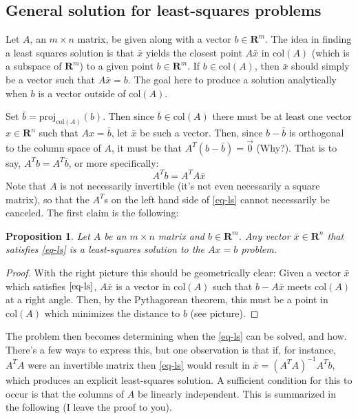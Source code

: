 \documentclass[12pt]{article}
\numberwithin{equation}{subsection}
\numberwithin{figure}{subsection}
\newtheorem{prop}[subsection]{Proposition}
\theoremstyle{note}
\newcommand{\R}{\mathbf{R}}
\newcommand\col[1]{\mathrm{col}(#1)}
\newcommand\proj[2]{\mathrm{proj}_{#1}(#2)}
\begin{document}
\subsection{General solution for least-squares problems}

Let $A$, an $m\times n$ matrix, be given along with a vector $b\in \R^m$. The idea in finding a least squares solution is that $\bar{x}$ yields the closest point $A\bar{x}$ in $\col{A}$ (which is a subspace of $\R^m$) to a given point $b\in \R^m$. If $b\in \col{A}$, then $\bar{x}$ should simply be a vector such that $A\bar{x}=b$. The goal here to produce a solution analytically when $b$ is a vector outside of $\col{A}$. 

Set $\bar{b}=\proj{\col{A}}{b}$. Then since $\bar{b}\in \col{A}$ there must be at least one vector  $x\in \R^n$ such that $Ax=\bar{b}$, let $\bar{x}$ be such a vector. Then, since $b-\bar{b}$ is orthogonal to the column space of $A$, it must be that $A^T(b-\bar{b})=\vec{0}$ (Why?). That is to say, $A^Tb=A^T\bar{b}$, or more specifically: \begin{equation} \label{eq-ls} A^Tb =A^T A\bar{x}\end{equation}Note that $A$ is not necessarily invertible (it's not even necessarily a square matrix), so that the $A^T$s on the left hand side of \eqref{eq-ls} cannot necessarily be canceled.
The first claim is the following:

\begin{prop}
Let $A$ be an $m\times n$ matrix and $b\in \R^m$. Any vector $\bar{x}\in \R^n$ that satisfies \eqref{eq-ls} is a least-squares solution to the $Ax=b$ problem.
\end{prop}

\begin{proof}
	With the right picture this should be geometrically clear: Given a vector $\bar{x}$ which satisfies $\eqref{eq-ls}$, $A\bar{x}$ is a vector in $\col{A}$ such that $b-A\bar{x}$ meets $\col{A}$ at a right angle. Then, by the Pythagorean theorem, this must be a point in $\col{A}$ which minimizes the distance to $b$ (see picture).
\end{proof}

The problem then becomes determining when the \eqref{eq-ls} can be solved, and how. There's a few ways to express this, but one observation is that if, for instance, $A^TA$ were an invertible matrix then \eqref{eq-ls} would result in $\bar{x}=(A^TA)^{-1}A^Tb$, which produces an explicit least-squares solution. A sufficient condition for this to occur is that the columns of $A$ be linearly independent. This is summarized in the following (I leave the proof to you).
\end{document}
